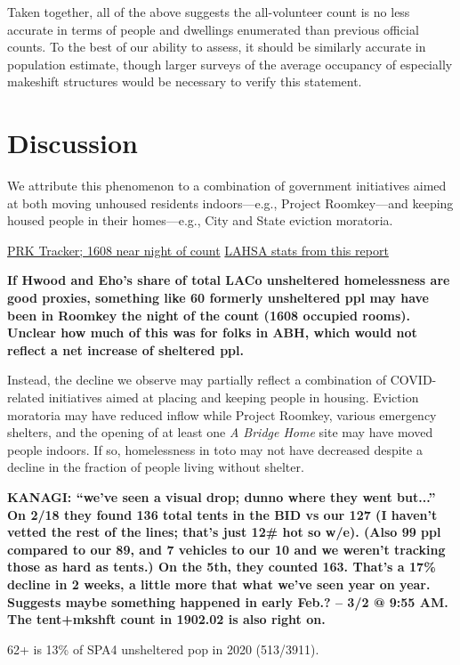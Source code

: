 \documentclass[11pt]{article}
\def\bfr{\bf\color{red}}
\begin{document}
Taken together, all of the above suggests the all-volunteer count is no less accurate in terms of people and
dwellings enumerated than previous official counts. To the best of our ability to assess, it should be similarly
accurate in population estimate, though larger surveys of the average occupancy of especially makeshift 
structures would be necessary to verify this statement.

\section{Discussion}

We attribute this phenomenon to a combination of government initiatives aimed at both moving unhoused
residents indoors---e.g., Project Roomkey---and keeping housed people in their homes---e.g., City and State
eviction moratoria. 

\href{https://projectroomkeytracker.com/}{PRK Tracker; 1608 near night of count}
\href{https://www.lahsa.org/documents?id=4686-2020-greater-los-angeles-city-community-homelessness-report-service-planning-area-4.pdf}{LAHSA stats from this report}

{\bfr If Hwood and Eho's share of total LACo unsheltered homelessness are good proxies, something
like 60 formerly unsheltered ppl may have been in Roomkey the night of the count (1608 occupied rooms). 
Unclear how much of this was for folks in ABH, which would not reflect a net increase of sheltered ppl.}

Instead, the decline we observe may partially reflect a combination of COVID-related initiatives aimed at placing 
and keeping people in housing. Eviction moratoria may have reduced inflow while Project Roomkey, various 
emergency shelters, and the opening of at least one {\it A Bridge Home} site may have moved people indoors. If so, 
homelessness in toto may not have decreased despite a decline in the fraction of people living without shelter. 

{\bfr KANAGI: ``we've seen a visual drop; dunno where they went but...'' On 2/18 they found 136 
total tents in the BID vs our 127 (I haven't vetted the rest of the lines; that's just 12\# hot so w/e). (Also 99
ppl compared to our 89, and 7 vehicles to our 10 and we weren't tracking those as hard as tents.) 
On the 5th, they counted 163. That's a 17\% decline in 2 weeks, a little more that what we've seen year on year.
Suggests maybe something happened in early Feb.? -- 3/2 @ 9:55 AM. The tent+mkshft count in 1902.02 is also 
right on.

62+ is 13\% of SPA4 unsheltered pop in 2020 (513/3911).}
\end{document}
